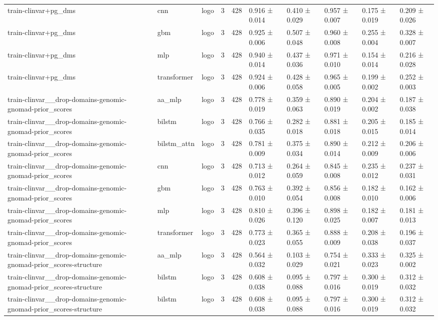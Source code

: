 \begin{table}[t]
\begin{tabular}{llllllllll}
train-clinvar+pg\_dms & cnn & logo & 3 & 428 & 0.916 ± 0.014 & 0.410 ± 0.029 & 0.957 ± 0.007 & 0.175 ± 0.019 & 0.209 ± 0.026 \\
train-clinvar+pg\_dms & gbm & logo & 3 & 428 & 0.925 ± 0.006 & 0.507 ± 0.048 & 0.960 ± 0.008 & 0.255 ± 0.004 & 0.328 ± 0.007 \\
train-clinvar+pg\_dms & mlp & logo & 3 & 428 & 0.940 ± 0.014 & 0.437 ± 0.036 & 0.971 ± 0.010 & 0.154 ± 0.014 & 0.216 ± 0.028 \\
train-clinvar+pg\_dms & transformer & logo & 3 & 428 & 0.924 ± 0.006 & 0.428 ± 0.058 & 0.965 ± 0.005 & 0.199 ± 0.002 & 0.252 ± 0.003 \\
train-clinvar\_\_drop-domains-genomic-gnomad-prior\_scores & aa\_mlp & logo & 3 & 428 & 0.778 ± 0.019 & 0.359 ± 0.063 & 0.890 ± 0.019 & 0.204 ± 0.002 & 0.187 ± 0.038 \\
train-clinvar\_\_drop-domains-genomic-gnomad-prior\_scores & bilstm & logo & 3 & 428 & 0.766 ± 0.035 & 0.282 ± 0.018 & 0.881 ± 0.018 & 0.205 ± 0.015 & 0.185 ± 0.014 \\
train-clinvar\_\_drop-domains-genomic-gnomad-prior\_scores & bilstm\_attn & logo & 3 & 428 & 0.781 ± 0.009 & 0.375 ± 0.034 & 0.890 ± 0.014 & 0.212 ± 0.009 & 0.206 ± 0.006 \\
train-clinvar\_\_drop-domains-genomic-gnomad-prior\_scores & cnn & logo & 3 & 428 & 0.713 ± 0.012 & 0.264 ± 0.059 & 0.845 ± 0.008 & 0.235 ± 0.012 & 0.237 ± 0.031 \\
train-clinvar\_\_drop-domains-genomic-gnomad-prior\_scores & gbm & logo & 3 & 428 & 0.763 ± 0.010 & 0.392 ± 0.054 & 0.856 ± 0.008 & 0.182 ± 0.010 & 0.162 ± 0.006 \\
train-clinvar\_\_drop-domains-genomic-gnomad-prior\_scores & mlp & logo & 3 & 428 & 0.810 ± 0.026 & 0.396 ± 0.120 & 0.898 ± 0.025 & 0.182 ± 0.007 & 0.181 ± 0.013 \\
train-clinvar\_\_drop-domains-genomic-gnomad-prior\_scores & transformer & logo & 3 & 428 & 0.773 ± 0.023 & 0.365 ± 0.055 & 0.888 ± 0.009 & 0.208 ± 0.038 & 0.196 ± 0.037 \\
train-clinvar\_\_drop-domains-genomic-gnomad-prior\_scores-structure & aa\_mlp & logo & 3 & 428 & 0.564 ± 0.032 & 0.103 ± 0.029 & 0.754 ± 0.021 & 0.333 ± 0.023 & 0.325 ± 0.002 \\
train-clinvar\_\_drop-domains-genomic-gnomad-prior\_scores-structure & bilstm & logo & 3 & 428 & 0.608 ± 0.038 & 0.095 ± 0.088 & 0.797 ± 0.016 & 0.300 ± 0.019 & 0.312 ± 0.032 \\
train-clinvar\_\_drop-domains-genomic-gnomad-prior\_scores-structure & bilstm & logo & 3 & 428 & 0.608 ± 0.038 & 0.095 ± 0.088 & 0.797 ± 0.016 & 0.300 ± 0.019 & 0.312 ± 0.032 \\

\end{tabular}
\end{table}
